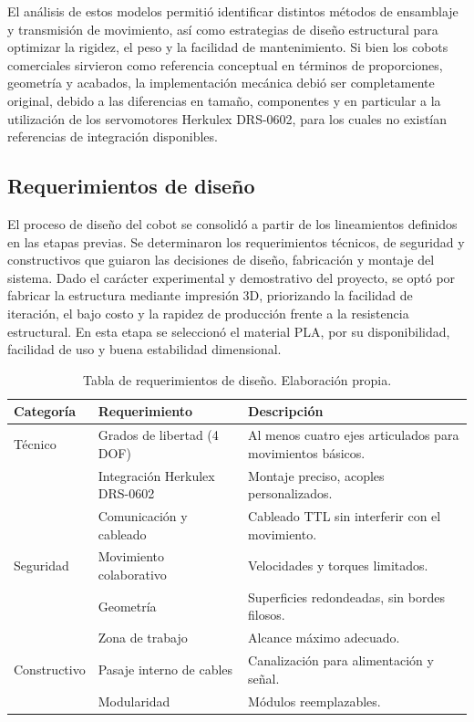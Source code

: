 El análisis de estos modelos permitió identificar distintos métodos de ensamblaje y transmisión de movimiento, así como estrategias de diseño estructural para optimizar la rigidez, el peso y la facilidad de mantenimiento. Si bien los cobots comerciales sirvieron como referencia conceptual en términos de proporciones, geometría y acabados, la implementación mecánica debió ser completamente original, debido a las diferencias en tamaño, componentes y en particular a la utilización de los servomotores Herkulex DRS-0602, para los cuales no existían referencias de integración disponibles.

\subsection{Requerimientos de diseño}

El proceso de diseño del cobot se consolidó a partir de los lineamientos definidos en las etapas previas. Se determinaron los requerimientos técnicos, de seguridad y constructivos que guiaron las decisiones de diseño, fabricación y montaje del sistema. Dado el carácter experimental y demostrativo del proyecto, se optó por fabricar la estructura mediante impresión 3D, priorizando la facilidad de iteración, el bajo costo y la rapidez de producción frente a la resistencia estructural. En esta etapa se seleccionó el material PLA, por su disponibilidad, facilidad de uso y buena estabilidad dimensional.

\begin{table}[htbp]
  \centering
  \caption{Tabla de requerimientos de diseño. Elaboración propia.}
  \label{tab:requerimientos}
  \small
  \begin{tabular}{p{2.2cm}p{3.5cm}p{6.5cm}}
    \toprule
    Categoría & Requerimiento & Descripción \\
    \midrule
    Técnico & Grados de libertad (4 DOF) & Al menos cuatro ejes articulados para movimientos básicos. \\
    & Integración Herkulex DRS-0602 & Montaje preciso, acoples personalizados. \\
    & Comunicación y cableado & Cableado TTL sin interferir con el movimiento. \\
    \midrule
    Seguridad & Movimiento colaborativo & Velocidades y torques limitados. \\
    & Geometría & Superficies redondeadas, sin bordes filosos. \\
    & Zona de trabajo & Alcance máximo adecuado. \\
    \midrule
    Constructivo & Pasaje interno de cables & Canalización para alimentación y señal. \\
    & Modularidad & Módulos reemplazables. \\
    \bottomrule
  \end{tabular}
\end{table}

